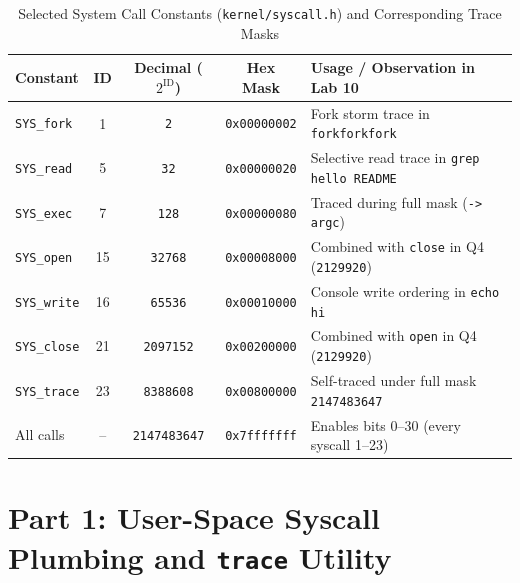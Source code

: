\documentclass[12pt,a4paper]{article}
\begin{document}
\begin{table}[H]
\centering
\caption{Selected System Call Constants (\texttt{kernel/syscall.h}) and Corresponding Trace Masks}
\begin{tabularx}{\textwidth}{l c c c >{\raggedright\arraybackslash}X}
\toprule
\textbf{Constant} & \textbf{ID} & \textbf{Decimal ($2^{\text{ID}}$)} & \textbf{Hex Mask} & \textbf{Usage / Observation in Lab 10} \\
\midrule
\texttt{SYS\_fork}  & 1  & \texttt{2}          & \texttt{0x00000002} & Fork storm trace in \texttt{forkforkfork} \\
\texttt{SYS\_read}  & 5  & \texttt{32}         & \texttt{0x00000020} & Selective read trace in \texttt{grep hello README} \\
\texttt{SYS\_exec}  & 7  & \texttt{128}        & \texttt{0x00000080} & Traced during full mask (\texttt{-> argc}) \\
\texttt{SYS\_open}  & 15 & \texttt{32768}      & \texttt{0x00008000} & Combined with \texttt{close} in Q4 (\texttt{2129920}) \\
\texttt{SYS\_write} & 16 & \texttt{65536}      & \texttt{0x00010000} & Console write ordering in \texttt{echo hi} \\
\texttt{SYS\_close} & 21 & \texttt{2097152}    & \texttt{0x00200000} & Combined with \texttt{open} in Q4 (\texttt{2129920}) \\
\texttt{SYS\_trace} & 23 & \texttt{8388608}    & \texttt{0x00800000} & Self-traced under full mask \texttt{2147483647} \\
All calls           & -- & \texttt{2147483647} & \texttt{0x7fffffff} & Enables bits 0--30 (every syscall 1--23) \\
\bottomrule
\end{tabularx}
\end{table}

\section{Part 1: User-Space Syscall Plumbing and \texttt{trace} Utility}
\end{document}
